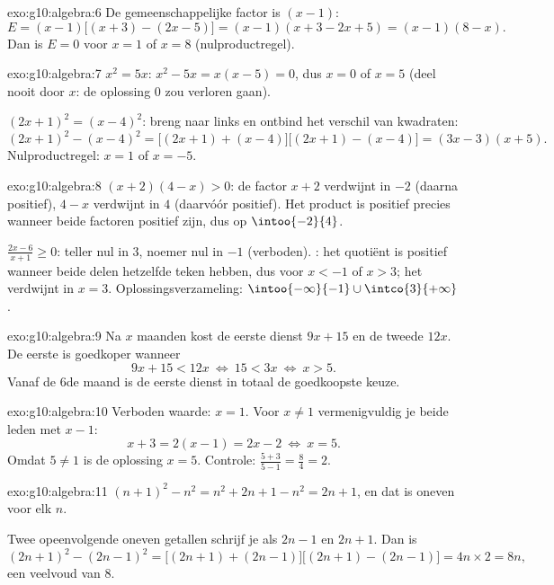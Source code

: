 \begin{solution}{exo:g10:algebra:6}
De gemeenschappelijke factor is $(x-1)$:
\[
E = (x-1)\bigl[(x+3) - (2x - 5)\bigr] = (x-1)(x + 3 - 2x + 5)
= (x-1)(8 - x).
\]
Dan is $E = 0$ voor $x = 1$ of $x = 8$ (nulproductregel).
\end{solution}

\begin{solution}{exo:g10:algebra:7}
$x^2 = 5x$: $x^2 - 5x = x(x - 5) = 0$, dus $x = 0$ of $x = 5$ (deel nooit
door $x$: de oplossing $0$ zou verloren gaan).

$(2x+1)^2 = (x-4)^2$: breng naar links en ontbind het verschil van
kwadraten:
\[
(2x+1)^2 - (x-4)^2
= \bigl[(2x+1) + (x-4)\bigr]\bigl[(2x+1) - (x-4)\bigr]
= (3x - 3)(x + 5).
\]
Nulproductregel: $x = 1$ of $x = -5$.
\end{solution}

\begin{solution}{exo:g10:algebra:8}
$(x+2)(4-x) > 0$: de factor $x + 2$ verdwijnt in $-2$ (daarna positief),
$4 - x$ verdwijnt in $4$ (daarvóór positief). Het product is positief precies
wanneer beide factoren positief zijn, dus op $\intoo{-2}{4}$.

$\frac{2x-6}{x+1} \geq 0$: teller nul in $3$, noemer nul in $-1$ (verboden).
: het quotiënt is positief wanneer beide delen hetzelfde teken
hebben, dus voor $x < -1$ of $x > 3$; het verdwijnt in $x = 3$.
Oplossingsverzameling: $\intoo{-\infty}{-1} \cup \intco{3}{+\infty}$.
\end{solution}

\begin{solution}{exo:g10:algebra:9}
Na $x$ maanden kost de eerste dienst $9x + 15$ en de tweede $12x$. De eerste
is goedkoper wanneer
\[
9x + 15 < 12x
\ \Longleftrightarrow\
15 < 3x
\ \Longleftrightarrow\
x > 5 .
\]
Vanaf de $6$de maand is de eerste dienst in totaal de goedkoopste keuze.
\end{solution}

\begin{solution}{exo:g10:algebra:10}
Verboden waarde: $x = 1$. Voor $x \neq 1$ vermenigvuldig je beide leden met
$x - 1$:
\[
x + 3 = 2(x - 1) = 2x - 2
\ \Longleftrightarrow\
x = 5 .
\]
Omdat $5 \neq 1$ is de oplossing $x = 5$. Controle:
$\frac{5+3}{5-1} = \frac84 = 2$.
\end{solution}

\begin{solution}{exo:g10:algebra:11}
$(n+1)^2 - n^2 = n^2 + 2n + 1 - n^2 = 2n + 1$, en dat is oneven voor elk
 $n$.

Twee opeenvolgende oneven getallen schrijf je als $2n - 1$ en $2n + 1$. Dan
is
\[
(2n+1)^2 - (2n-1)^2
= \bigl[(2n+1)+(2n-1)\bigr]\bigl[(2n+1)-(2n-1)\bigr]
= 4n \times 2 = 8n,
\]
een veelvoud van $8$.
\end{solution}

